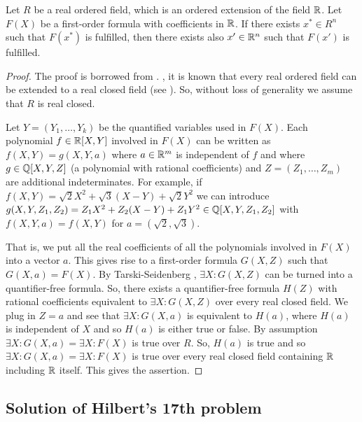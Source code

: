 \begin{corollary}  
	\label{cor:tarski}
	Let $R$ be a real ordered field, which is an ordered extension of the field $\mathbb{R}$. Let $F(X)$ be a first-order formula with coefficients in $\mathbb{R}$. If there exists $x^\ast \in R^n$ such that $F(x^\ast)$ is fulfilled, then there exists also $x' \in \mathbb{R}^n$ such that $F(x')$ is fulfilled. 
\end{corollary}
\begin{proof}
	The proof is borrowed from \cite[Cor.~1.4.7]{Bochnak:Coste:Roy:1998}. , it is known that every real ordered field can be extended to a real closed field (see \cite{Bochnak:Coste:Roy:1998}). So, without loss of generality we assume that $R$ is real closed. 
	
	Let $Y=(Y_1,\ldots,Y_k)$ be the quantified variables used in $F(X)$. 
	Each polynomial $f \in \mathbb{R}[X,Y]$ involved in $F(X)$ can be written as $f(X,Y) = g(X,Y,a)$ where $a \in \mathbb{R}^m$ is independent of $f$ and where $g \in \mathbb{Q}[X,Y,Z]$ (a polynomial with rational coefficients) and $Z=(Z_1,\ldots,Z_m)$ are additional indeterminates. For example, if $f(X,Y) = \sqrt{2} X^2 + \sqrt{3} (X-Y) + \sqrt{2} Y^2$ we can introduce $g(X,Y,Z_1,Z_2) = Z_1 X^2 + Z_2 (X-Y) + Z_1 Y^2 \in \mathbb{Q}[X,Y,Z_1,Z_2]$ with $f(X,Y,a) = f(X,Y)$ for $a=(\sqrt{2},\sqrt{3})$.
	
	That is, we put all the real coefficients of all the polynomials involved in $F(X)$ into a vector $a$. This gives rise to a first-order formula $G(X,Z)$ such that $G(X,a) = F(X)$. By Tarski-Seidenberg , $\exists X : G(X,Z)$ can be turned into a quantifier-free formula. So, there exists a quantifier-free formula $H(Z)$ with rational coefficients equivalent to $\exists X : G(X,Z)$ over every real closed field. We plug in $Z=a$ and see that $\exists X : G(X,a)$ is equivalent to $H(a)$, where $H(a)$ is independent of $X$ and so $H(a)$ is either true or false. By assumption $\exists X : G(X,a) = \exists X : F(X)$ is true over $R$. So, $H(a)$ is true and so $\exists X : G(X,a) = \exists X : F(X)$ is true over every real closed field containing $\mathbb{R}$ including $\mathbb{R}$ itself. This gives the assertion. 
\end{proof}

\subsection{Solution of Hilbert's 17th problem}

